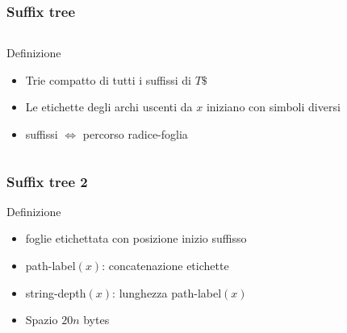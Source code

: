 \begin{frame}[fragile]
\frametitle{Suffix tree}
\begin{columns}
\begin{column}{0.5\textwidth}
\begin{block}{Definizione}
\begin{itemize}
\item
Trie compatto di tutti i suffissi di $T\$$
\item
Le etichette degli archi uscenti da $x$ iniziano con simboli diversi
\item
suffissi $\Leftrightarrow$ percorso radice-foglia
\end{itemize}
\end{block}
\end{column}
\begin{column}{0.5\textwidth}
\begin{center}
\end{center}
\end{column}
\end{columns}
\end{frame}

\begin{frame}[fragile]
\frametitle{Suffix tree 2}
\begin{block}{Definizione}
\begin{itemize}
\item
foglie etichettata con posizione inizio suffisso
\item
path-label$(x)$: concatenazione etichette
\item
string-depth$(x)$: lunghezza path-label$(x)$
\item
Spazio $20n$ bytes
\end{itemize}
\end{block}
\end{frame}

